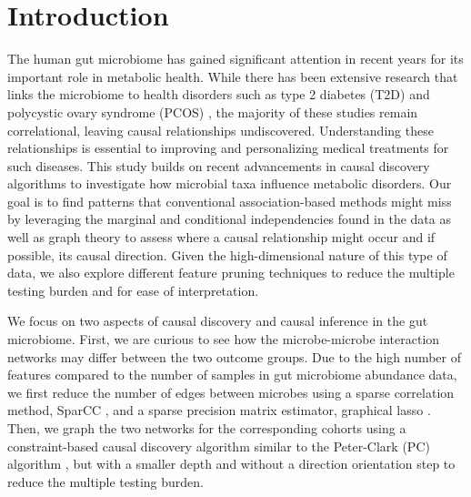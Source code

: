 \documentclass[12pt,letterpaper]{article}
\begin{document}
\maketoc
\clearpage


\section{Introduction}

The human gut microbiome has gained significant attention in recent years for its important role in metabolic health. While there has been extensive research that links the microbiome to health disorders such as type 2 diabetes (T2D) \citep{zhou2019t2d} and polycystic ovary syndrome (PCOS) \citep{yang2024pcos}, the majority of these studies remain correlational, leaving causal relationships undiscovered. Understanding these relationships is essential to improving and personalizing medical treatments for such diseases.
This study builds on recent advancements in causal discovery algorithms to investigate how microbial taxa influence metabolic disorders. Our goal is to find patterns that conventional association-based methods might miss by leveraging the marginal and conditional independencies found in the data as well as graph theory to assess where a causal relationship might occur and if possible, its causal direction. Given the high-dimensional nature of this type of data, we also explore different feature pruning techniques to reduce the multiple testing burden and for ease of interpretation. 

We focus on two aspects of causal discovery and causal inference in the gut microbiome. First, we are curious to see how the microbe-microbe interaction networks may differ between the two outcome groups. Due to the high number of features compared to the number of samples in gut microbiome abundance data, we first reduce the number of edges between microbes using a sparse correlation method, SparCC \citep{weiss2016correlationbenchmark, friedman2012sparcc}, and a sparse precision matrix estimator, graphical lasso \citep{friedman2008glasso}. Then, we graph the two networks for the corresponding cohorts using a constraint-based causal discovery algorithm similar to the Peter-Clark (PC) algorithm \citep{glymour2019review}, but with a smaller depth and without a direction orientation step to reduce the multiple testing burden.
\end{document}
